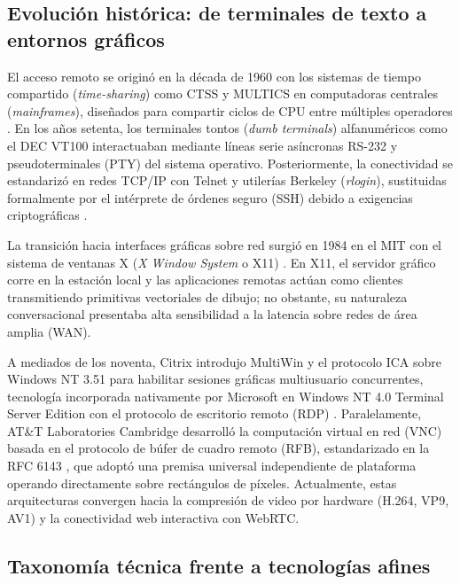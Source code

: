 \documentclass[12pt]{article}
\begin{document}
\subsection{Evolución histórica: de terminales de texto a entornos gráficos}\label{sec:evolucionHistorica}

El acceso remoto se originó en la década de 1960 con los sistemas de tiempo compartido (\textit{time-sharing}) como CTSS y MULTICS en computadoras centrales (\textit{mainframes}), diseñados para compartir ciclos de CPU entre múltiples operadores \parencite[\S 1.2, p.\ 9]{silberschatz2006fundamentos}. En los años setenta, los terminales tontos (\textit{dumb terminals}) alfanuméricos como el DEC VT100 interactuaban mediante líneas serie asíncronas RS-232 y pseudoterminales (PTY) del sistema operativo. Posteriormente, la conectividad se estandarizó en redes TCP/IP con Telnet \parencite{rfc854} y utilerías Berkeley (\textit{rlogin}), sustituidas formalmente por el intérprete de órdenes seguro (SSH) debido a exigencias criptográficas \parencite{rfc4251}.

La transición hacia interfaces gráficas sobre red surgió en 1984 en el MIT con el sistema de ventanas X (\textit{X Window System} o X11) \parencite{scheifler1986x, deitel2004operating}. En X11, el servidor gráfico corre en la estación local y las aplicaciones remotas actúan como clientes transmitiendo primitivas vectoriales de dibujo; no obstante, su naturaleza conversacional presentaba alta sensibilidad a la latencia sobre redes de área amplia (WAN).

A mediados de los noventa, Citrix introdujo MultiWin y el protocolo ICA sobre Windows NT 3.51 para habilitar sesiones gráficas multiusuario concurrentes, tecnología incorporada nativamente por Microsoft en Windows NT 4.0 Terminal Server Edition con el protocolo de escritorio remoto (RDP) \parencite{microsoftRdpSpecification}. Paralelamente, AT\&T Laboratories Cambridge desarrolló la computación virtual en red (VNC) basada en el protocolo de búfer de cuadro remoto (RFB), estandarizado en la RFC 6143 \parencite{richardson1998virtual, rfc6143}, que adoptó una premisa universal independiente de plataforma operando directamente sobre rectángulos de píxeles. Actualmente, estas arquitecturas convergen hacia la compresión de video por hardware (H.264, VP9, AV1) y la conectividad web interactiva con WebRTC.

\subsection{Taxonomía técnica frente a tecnologías afines}\label{sec:taxonomiaTecnica}
\end{document}
